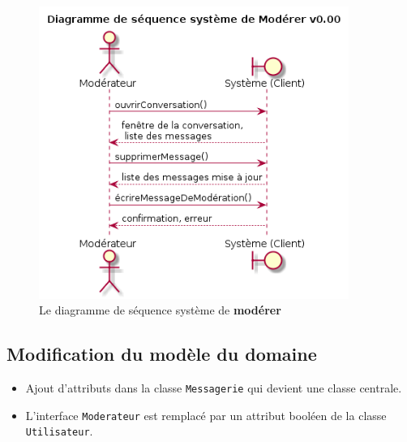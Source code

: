 \documentclass[11pt,dvipsnames,svgnames]{report}
\begin{document}
\begin{figure}[H]
\caption{Le diagramme de séquence système de \textbf{modérer}}
\centerline{\includegraphics[width=0.9\textwidth]{diagrammes/dss-moderer.png}}
\end{figure}

\subsection{Modification du modèle du domaine}
\begin{itemize}
\item Ajout d'attributs dans la classe \texttt{Messagerie} qui devient une classe centrale.
\item L'interface \texttt{Moderateur} est remplacé par un attribut booléen de la classe \texttt{Utilisateur}.
\end{itemize}
\end{document}
